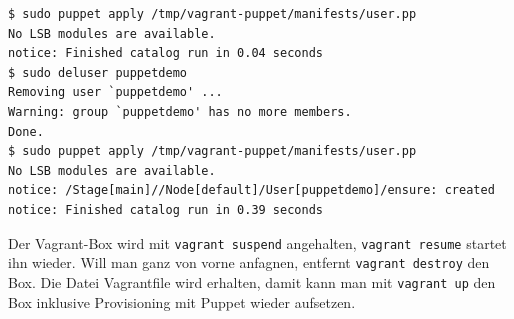 \documentclass[12pt,a4paper,ngerman]{article}
\begin{document}
\begin{lstlisting}[caption=Puppet apply im Box, label=vagrant-apply]
$ sudo puppet apply /tmp/vagrant-puppet/manifests/user.pp
No LSB modules are available.
notice: Finished catalog run in 0.04 seconds
$ sudo deluser puppetdemo
Removing user `puppetdemo' ...
Warning: group `puppetdemo' has no more members.
Done.
$ sudo puppet apply /tmp/vagrant-puppet/manifests/user.pp
No LSB modules are available.
notice: /Stage[main]//Node[default]/User[puppetdemo]/ensure: created
notice: Finished catalog run in 0.39 seconds
\end{lstlisting}

Der Vagrant-Box wird mit \lstinline$vagrant suspend$ angehalten, \lstinline$vagrant resume$ startet ihn wieder. Will man ganz von vorne anfagnen, entfernt \lstinline$vagrant destroy$ den Box. Die Datei Vagrantfile wird erhalten, damit kann man mit \lstinline$vagrant up$ den Box inklusive Provisioning mit Puppet wieder aufsetzen.
\end{document}
